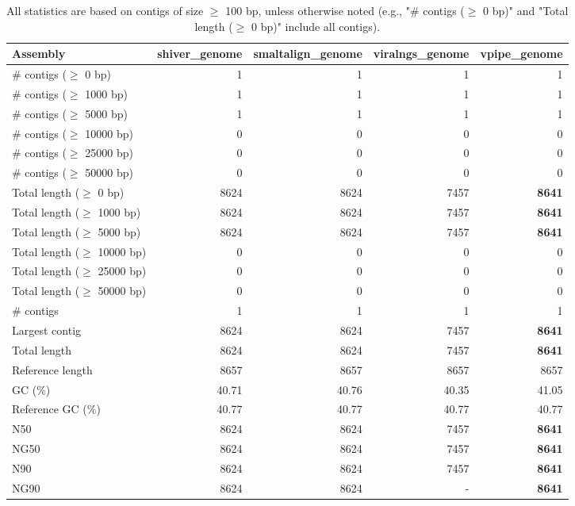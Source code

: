 \documentclass[12pt,a4paper]{article}
\begin{document}
\begin{table}[ht]
\begin{center}
\caption{All statistics are based on contigs of size $\geq$ 100 bp, unless otherwise noted (e.g., "\# contigs ($\geq$ 0 bp)" and "Total length ($\geq$ 0 bp)" include all contigs).}
\begin{tabular}{|l*{4}{|r}|}
\hline
Assembly & shiver\_genome & smaltalign\_genome & viralngs\_genome & vpipe\_genome \\ \hline
\# contigs ($\geq$ 0 bp) & 1 & 1 & 1 & 1 \\ \hline
\# contigs ($\geq$ 1000 bp) & 1 & 1 & 1 & 1 \\ \hline
\# contigs ($\geq$ 5000 bp) & 1 & 1 & 1 & 1 \\ \hline
\# contigs ($\geq$ 10000 bp) & 0 & 0 & 0 & 0 \\ \hline
\# contigs ($\geq$ 25000 bp) & 0 & 0 & 0 & 0 \\ \hline
\# contigs ($\geq$ 50000 bp) & 0 & 0 & 0 & 0 \\ \hline
Total length ($\geq$ 0 bp) & 8624 & 8624 & 7457 & {\bf 8641} \\ \hline
Total length ($\geq$ 1000 bp) & 8624 & 8624 & 7457 & {\bf 8641} \\ \hline
Total length ($\geq$ 5000 bp) & 8624 & 8624 & 7457 & {\bf 8641} \\ \hline
Total length ($\geq$ 10000 bp) & 0 & 0 & 0 & 0 \\ \hline
Total length ($\geq$ 25000 bp) & 0 & 0 & 0 & 0 \\ \hline
Total length ($\geq$ 50000 bp) & 0 & 0 & 0 & 0 \\ \hline
\# contigs & 1 & 1 & 1 & 1 \\ \hline
Largest contig & 8624 & 8624 & 7457 & {\bf 8641} \\ \hline
Total length & 8624 & 8624 & 7457 & {\bf 8641} \\ \hline
Reference length & 8657 & 8657 & 8657 & 8657 \\ \hline
GC (\%) & 40.71 & 40.76 & 40.35 & 41.05 \\ \hline
Reference GC (\%) & 40.77 & 40.77 & 40.77 & 40.77 \\ \hline
N50 & 8624 & 8624 & 7457 & {\bf 8641} \\ \hline
NG50 & 8624 & 8624 & 7457 & {\bf 8641} \\ \hline
N90 & 8624 & 8624 & 7457 & {\bf 8641} \\ \hline
NG90 & 8624 & 8624 & - & {\bf 8641} \\ \hline

\end{tabular}
\end{center}
\end{table}
\end{document}
